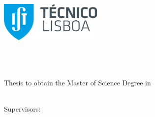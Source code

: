 
\begin{titlepage}
\includegraphics[width=5cm]{images/ist-logo}~\\[1.5cm]
\begin{center}
{\LARGE \textbf{\Title}}\\[1.5cm]
{\Large \Subtitle}\\[1.5cm]
{\Large \textbf{\StudentName}}\\[1.5cm]
{\large Thesis to obtain the Master of Science Degree in}\\[0.35cm]
{\LARGE \textbf{\DegreeName}}\\[1.5cm]

\begin{minipage}[t]{.32\textwidth}
  \begin{flushright}
    {\large Supervisors:~~}\\
  \end{flushright}
\end{minipage}%
\begin{minipage}[t]{.68\textwidth}
  \begin{flushleft}
    {\large \MainSupervisor \\
     \large \SecondSupervisor}
  \end{flushleft}
\end{minipage}\\[1.5cm]


\end{center}
\end{titlepage}
